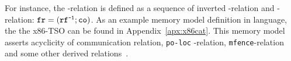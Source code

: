 For instance, the \fr-relation is defined as a sequence of inverted \rf-relation and \co-relation: $\texttt{fr} = (\texttt{rf}^{\texttt{-1}};\texttt{co})$. As an example memory model definition in \cat{} language, the the x86-TSO can be found in Appendix~\ref{apx:x86cat}. This memory model asserts acyclicity of communication relation, \texttt{po-loc} -relation, \texttt{mfence}-relation and some other derived relations~\cite{owens2009better}.
